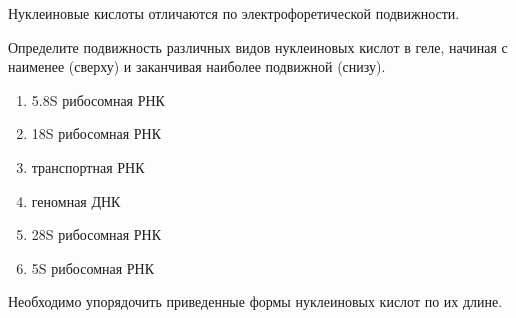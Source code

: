 
Нуклеиновые кислоты отличаются по электрофоретической подвижности.

Определите подвижность различных видов нуклеиновых кислот в геле, начиная с наименее (сверху) и заканчивая наиболее подвижной (снизу).

\begin{enumerate}
    \item 5.8S рибосомная РНК
    \item 18S рибосомная РНК
    \item транспортная РНК
    \item геномная ДНК
    \item 28S рибосомная РНК
    \item 5S рибосомная РНК
\end{enumerate}

\explanationSection

Необходимо упорядочить приведенные формы нуклеиновых кислот по их длине.

